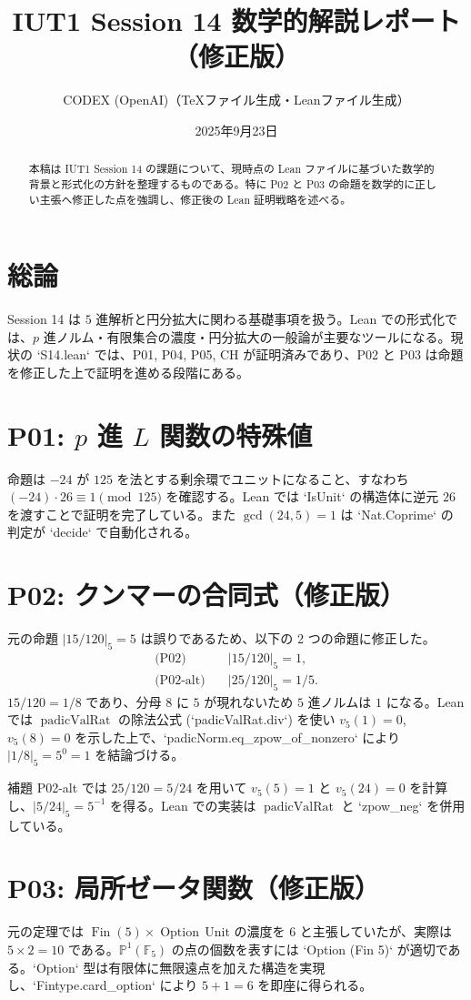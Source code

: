 \documentclass[a4paper]{ltjsarticle}
\title{IUT1 Session 14 数学的解説レポート（修正版）}
\author{CODEX (OpenAI)（TeXファイル生成・Leanファイル生成）}
\date{2025年9月23日}
\begin{document}
\maketitle

\begin{abstract}
本稿は IUT1 Session 14 の課題について、現時点の Lean ファイルに基づいた数学的背景と形式化の方針を整理するものである。特に P02 と P03 の命題を数学的に正しい主張へ修正した点を強調し、修正後の Lean 証明戦略を述べる。
\end{abstract}

\section{総論}
Session 14 は $5$ 進解析と円分拡大に関わる基礎事項を扱う。Lean での形式化では、$p$ 進ノルム・有限集合の濃度・円分拡大の一般論が主要なツールになる。現状の `S14.lean` では、P01, P04, P05, CH が証明済みであり、P02 と P03 は命題を修正した上で証明を進める段階にある。

\section{P01: $p$ 進 $L$ 関数の特殊値}
命題は $-24$ が $125$ を法とする剰余環でユニットになること、すなわち $(-24) \cdot 26 \equiv 1 \pmod{125}$ を確認する。Lean では `IsUnit` の構造体に逆元 $26$ を渡すことで証明を完了している。また $\gcd(24,5)=1$ は `Nat.Coprime` の判定が `decide` で自動化される。

\section{P02: クンマーの合同式（修正版）}
元の命題 $|15/120|_5 = 5$ は誤りであるため、以下の 2 つの命題に修正した。
\begin{align*}
\text{(P02)} &\quad |15/120|_5 = 1,\\
\text{(P02-alt)} &\quad |25/120|_5 = 1/5.
\end{align*}
$15/120 = 1/8$ であり、分母 $8$ に $5$ が現れないため $5$ 進ノルムは $1$ になる。Lean では $\operatorname{padicValRat}$ の除法公式 (`padicValRat.div`) を使い $v_5(1)=0$, $v_5(8)=0$ を示した上で、`padicNorm.eq_zpow_of_nonzero` により $|1/8|_5 = 5^0 = 1$ を結論づける。\par
補題 P02-alt では $25/120 = 5/24$ を用いて $v_5(5)=1$ と $v_5(24)=0$ を計算し、$|5/24|_5 = 5^{-1}$ を得る。Lean での実装は $\operatorname{padicValRat}$ と `zpow_neg` を併用している。

\section{P03: 局所ゼータ関数（修正版）}
元の定理では $\operatorname{Fin}(5) \times \operatorname{Option}\,\mathrm{Unit}$ の濃度を $6$ と主張していたが、実際は $5 \times 2 = 10$ である。$
\mathbb{P}^1(\mathbb{F}_5)$ の点の個数を表すには `Option (Fin 5)` が適切である。`Option` 型は有限体に無限遠点を加えた構造を実現し、`Fintype.card_option` により $5+1=6$ を即座に得られる。
\end{document}

